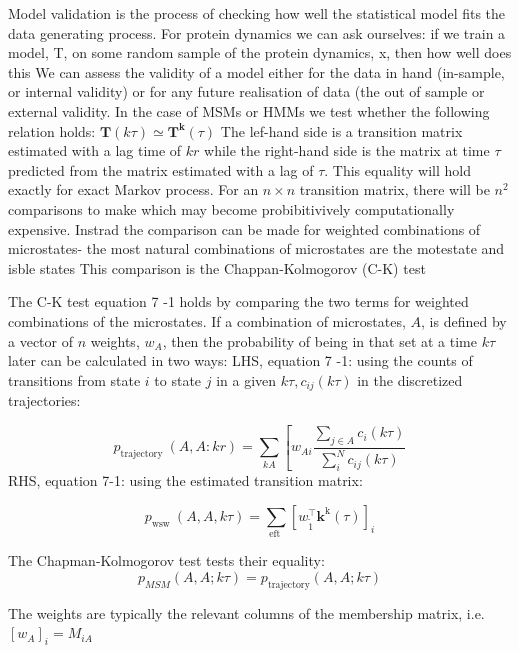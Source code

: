 Model validation is the process of checking how well the statistical model fits the data generating process. For protein dynamics we can ask ourselves: if we train a model, T, on some random sample of the protein dynamics, x, then how well does this We can assess the validity of a model either for the data in hand (in-sample, or internal validity) or for any future realisation of data (the out of sample or external validity. In the case of MSMs or HMMs we test whether the following relation holds:
$\mathbf{T}(k \tau) \simeq \mathbf{T}^{\mathbf{k}}(\tau)$
The lef-hand side is a transition matrix estimated with a lag time of $k r$ while the right-hand side is the matrix at time $\tau$ predicted from the matrix estimated with a lag of $\tau$. This equality will hold exactly for exact Markov process. For an $n \times n$ transition matrix, there will be $n^{2}$ comparisons to make which may become probibitivively computationally expensive. Instrad the comparison can be made for weighted combinations of microstates- the most natural combinations of microstates are the motestate and isble states This comparison is the Chappan-Kolmogorov (C-K) test

The C-K test equation 7 -1 holds by comparing the two terms for weighted combinations of the microstates. If a combination of microstates, $A$, is defined by a vector of $n$ weights, $w_{A}$, then the probability of being in that set at a time $k \tau$ later can be calculated in two ways:
LHS, equation 7 -1: using the counts of transitions from state $i$ to state $j$ in a given $k \tau, c_{i j}(k \tau)$ in the discretized trajectories:

\begin{equation}
p_{\text {trajectory }}(A, A: k r)=\sum_{k A}\left[w_{A i} \frac{\sum_{j \in A} c_{i}(k \tau)}{\sum_{i}^{N} c_{i j}(k \tau)}\right.
\end{equation}
RHS, equation 7-1: using the estimated transition matrix:

\begin{equation}
p_{\text {wsw }}(A, A, k \tau)=\sum_{\text {eft }}\left[w_{\tilde{1}}^{\top} \mathbf{k}^{\mathrm{k}}(\tau)\right]_{i}
\end{equation}

The Chapman-Kolmogorov test tests their equality:
\begin{equation}\label{eqn:ck_test}
p_{M S M}(A, A ; k \tau)=p_{\text {trajectory}}(A, A ; k \tau)
\end{equation}

The weights are typically the relevant columns of the membership matrix, i.e. $\left[w_{A}\right]_{i}=M_{i A}$
